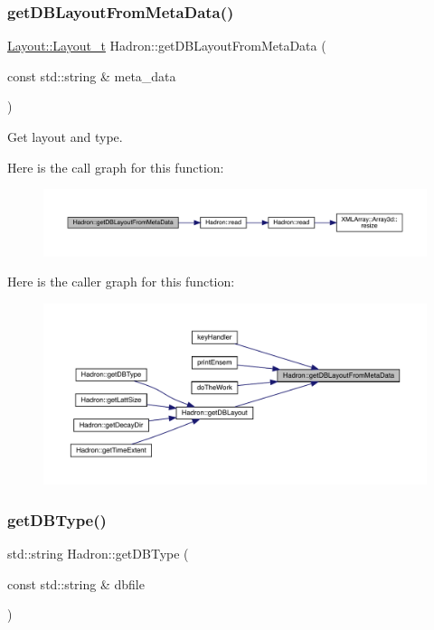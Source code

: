\subsubsection{\texorpdfstring{getDBLayoutFromMetaData()}{getDBLayoutFromMetaData()}}
{\footnotesize\ttfamily \mbox{\hyperlink{structHadron_1_1Layout_1_1Layout__t}{Layout\+::\+Layout\+\_\+t}} Hadron\+::get\+D\+B\+Layout\+From\+Meta\+Data (\begin{DoxyParamCaption}\item[{const std\+::string \&}]{meta\+\_\+data }\end{DoxyParamCaption})}



Get layout and type. 

Here is the call graph for this function\+:\nopagebreak
\begin{figure}[H]
\begin{center}
\leavevmode
\includegraphics[width=350pt]{d1/daf/namespaceHadron_a5f888183d0cbdadea2ebdf51020f5042_cgraph}
\end{center}
\end{figure}
Here is the caller graph for this function\+:\nopagebreak
\begin{figure}[H]
\begin{center}
\leavevmode
\includegraphics[width=350pt]{d1/daf/namespaceHadron_a5f888183d0cbdadea2ebdf51020f5042_icgraph}
\end{center}
\end{figure}
\mbox{\label{namespaceHadron_a82284ec1545a1a6b6794da8d973a1d57}} 
\subsubsection{\texorpdfstring{getDBType()}{getDBType()}}
{\footnotesize\ttfamily std\+::string Hadron\+::get\+D\+B\+Type (\begin{DoxyParamCaption}\item[{const std\+::string \&}]{dbfile }\end{DoxyParamCaption})}



